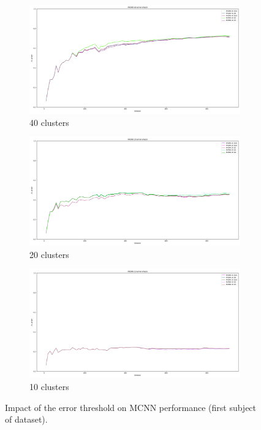 \begin{figure}
	 \begin{subfigure}[b]{0.49\textwidth}
		 \centering
		 \includegraphics[width=\linewidth]{figures/Banos_S1_shuf_MCNN_40_error_check.png}
		 \caption{40 clusters}
	 \end{subfigure}
	 \begin{subfigure}[b]{0.49\textwidth}
		 \centering
		 \includegraphics[width=\linewidth]{figures/Banos_S1_shuf_MCNN_20_error_check.png}
		 \caption{20 clusters}
	 \end{subfigure}
	 \begin{subfigure}[b]{0.49\textwidth}
		 \centering
		 \includegraphics[width=\linewidth]{figures/Banos_S1_shuf_MCNN_10_error_check.png}
		 \caption{10 clusters}
	 \end{subfigure}
	\caption{Impact of the error threshold on MCNN performance (first subject of \banosdataset dataset). }
	\label{fig:mcnn-tuning-error}
\end{figure}

